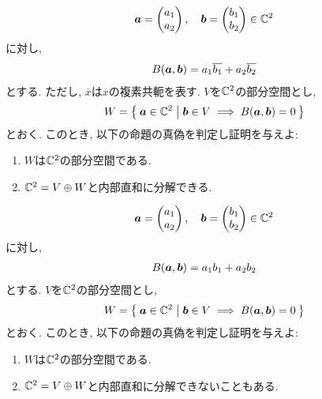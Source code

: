 \begin{quiz}  
  \begin{align*}
    \boldsymbol{a}=\begin{pmatrix}a_1\\a_2\end{pmatrix},\quad
    \boldsymbol{b}=\begin{pmatrix}b_1\\b_2\end{pmatrix}\in\mathbb{C}^2
  \end{align*}
  に対し,
  \begin{align*}
    B(\boldsymbol{a},\boldsymbol{b})= a_1 \overline{b_1}+ a_2 \overline{b_2}
  \end{align*}
  とする.
  ただし, $\overline{x}$は$x$の複素共軛を表す.
  $V$を$\mathbb{C}^2$の部分空間とし,
  \begin{align*}
    W=\Set{\boldsymbol{a}\in \mathbb{C}^2|\boldsymbol{b}\in V\implies B(\boldsymbol{a},\boldsymbol{b})=0}
  \end{align*}
  とおく.
  このとき,
  以下の命題の真偽を判定し証明を与えよ:
  \begin{enumerate}
  \item
    $W$は$\mathbb{C}^2$の部分空間である.
  \item
    $\mathbb{C}^2=V\oplus W$と内部直和に分解できる.    
  \end{enumerate}
\end{quiz}

\begin{quiz}  
  \begin{align*}
    \boldsymbol{a}=\begin{pmatrix}a_1\\a_2\end{pmatrix},\quad
    \boldsymbol{b}=\begin{pmatrix}b_1\\b_2\end{pmatrix}\in\mathbb{C}^2
  \end{align*}
  に対し,
  \begin{align*}
    B(\boldsymbol{a},\boldsymbol{b})= a_1 b_1+ a_2 b_2
  \end{align*}
  とする.
  $V$を$\mathbb{C}^2$の部分空間とし,
  \begin{align*}
    W=\Set{\boldsymbol{a}\in \mathbb{C}^2|\boldsymbol{b}\in V\implies B(\boldsymbol{a},\boldsymbol{b})=0}
  \end{align*}
  とおく.
  このとき,
  以下の命題の真偽を判定し証明を与えよ:
  \begin{enumerate}
  \item
    $W$は$\mathbb{C}^2$の部分空間である.
  \item
    $\mathbb{C}^2=V\oplus W$と内部直和に分解できないこともある.    
  \end{enumerate}
\end{quiz}

